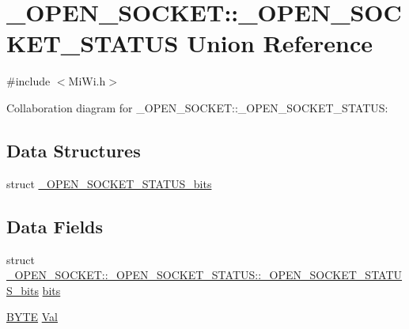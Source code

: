 \hypertarget{union___o_p_e_n___s_o_c_k_e_t_1_1___o_p_e_n___s_o_c_k_e_t___s_t_a_t_u_s}{}\section{\+\_\+\+O\+P\+E\+N\+\_\+\+S\+O\+C\+K\+E\+T\+:\+:\+\_\+\+O\+P\+E\+N\+\_\+\+S\+O\+C\+K\+E\+T\+\_\+\+S\+T\+A\+T\+U\+S Union Reference}
\label{union___o_p_e_n___s_o_c_k_e_t_1_1___o_p_e_n___s_o_c_k_e_t___s_t_a_t_u_s}


{\ttfamily \#include $<$Mi\+Wi.\+h$>$}



Collaboration diagram for \+\_\+\+O\+P\+E\+N\+\_\+\+S\+O\+C\+K\+E\+T\+:\+:\+\_\+\+O\+P\+E\+N\+\_\+\+S\+O\+C\+K\+E\+T\+\_\+\+S\+T\+A\+T\+U\+S\+:
\subsection*{Data Structures}
\begin{DoxyCompactItemize}
\item 
struct \hyperlink{struct___o_p_e_n___s_o_c_k_e_t_1_1___o_p_e_n___s_o_c_k_e_t___s_t_a_t_u_s_1_1___o_p_e_n___s_o_c_k_e_t___s_t_a_t_u_s__bits}{\+\_\+\+O\+P\+E\+N\+\_\+\+S\+O\+C\+K\+E\+T\+\_\+\+S\+T\+A\+T\+U\+S\+\_\+bits}
\end{DoxyCompactItemize}
\subsection*{Data Fields}
\begin{DoxyCompactItemize}
\item 
struct \hyperlink{struct___o_p_e_n___s_o_c_k_e_t_1_1___o_p_e_n___s_o_c_k_e_t___s_t_a_t_u_s_1_1___o_p_e_n___s_o_c_k_e_t___s_t_a_t_u_s__bits}{\+\_\+\+O\+P\+E\+N\+\_\+\+S\+O\+C\+K\+E\+T\+::\+\_\+\+O\+P\+E\+N\+\_\+\+S\+O\+C\+K\+E\+T\+\_\+\+S\+T\+A\+T\+U\+S\+::\+\_\+\+O\+P\+E\+N\+\_\+\+S\+O\+C\+K\+E\+T\+\_\+\+S\+T\+A\+T\+U\+S\+\_\+bits} \hyperlink{union___o_p_e_n___s_o_c_k_e_t_1_1___o_p_e_n___s_o_c_k_e_t___s_t_a_t_u_s_a139d19e8e96013a2292a78bbe08399ef}{bits}
\item 
\hyperlink{_generic_type_defs_8h_a4ae1dab0fb4b072a66584546209e7d58}{B\+Y\+T\+E} \hyperlink{union___o_p_e_n___s_o_c_k_e_t_1_1___o_p_e_n___s_o_c_k_e_t___s_t_a_t_u_s_a5ab8c2bf45b20b5f7aa3a4f083896cec}{Val}
\end{DoxyCompactItemize}



